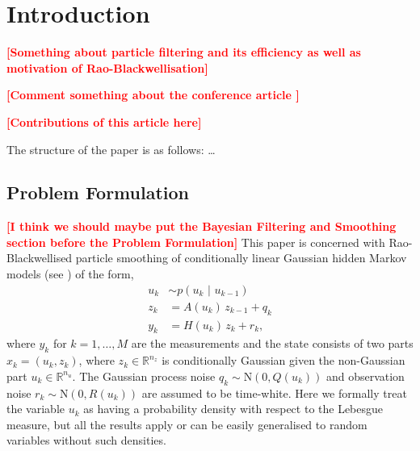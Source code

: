 \documentclass[twocolumn]{autart}    %
\newcommand{\comment}[1]{\textcolor{red}{\textbf{[#1]}}}
\begin{document}
\section{Introduction}
%
\comment{Something about particle filtering and its efficiency as well as
motivation of Rao-Blackwellisation}

\comment{Comment something about the conference article
  \cite{Sarkka+Bunch+Godsill:2012}}

\comment{Contributions of this article here}

The structure of the paper is as follows: \ldots


\subsection{Problem Formulation}
%
\comment{I think we should maybe put the Bayesian Filtering and Smoothing section before the Problem Formulation}
%
This paper is concerned with Rao-Blackwellised particle smoothing of conditionally linear Gaussian hidden Markov models
(see \cite{Doucet+Godsill+Andrieu:2000}) of the form,
%
\begin{equation}
\begin{split}
  u_k &\sim p(u_k \, \,|\, \, u_{k-1}) \\
  z_k &= A(u_{k}) \, z_{k-1} + q_{k} \\
  y_k &= H(u_k) \, z_{k} + r_{k},
\end{split}
\label{eq:condgauss}
\end{equation}
%
where $y_k$ for $k=1,\ldots,M$ are the measurements and the state consists of two parts $x_k = (u_k,z_k)$, where $z_k \in \mathbb{R}^{n_z}$ is conditionally Gaussian given the non-Gaussian part $u_k \in \mathbb{R}^{n_u}$. The Gaussian process noise $q_{k} \sim \mathrm{N}(0, Q(u_{k}))$ and observation noise $r_{k} \sim \mathrm{N}(0, R(u_{k}))$ are assumed to be time-white. Here we formally treat the variable $u_k$ as having a probability density with respect to the Lebesgue measure, but all the results apply or can be easily generalised to random variables without such densities.
\end{document}
